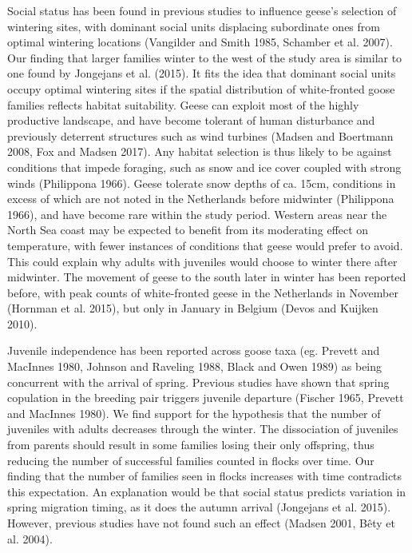 \documentclass[10pt,twocolumn]{paper}
\begin{document}
Social status has been found in previous studies to influence geese's
selection of wintering sites, with dominant social units displacing
subordinate ones from optimal wintering locations (Vangilder and Smith
1985, Schamber et al. 2007). Our finding that larger families winter to
the west of the study area is similar to one found by Jongejans et al.
(2015). It fits the idea that dominant social units occupy optimal
wintering sites if the spatial distribution of white-fronted goose
families reflects habitat suitability. Geese can exploit most of the
highly productive landscape, and have become tolerant of human
disturbance and previously deterrent structures such as wind turbines
(Madsen and Boertmann 2008, Fox and Madsen 2017). Any habitat selection
is thus likely to be against conditions that impede foraging, such as
snow and ice cover coupled with strong winds (Philippona 1966). Geese
tolerate snow depths of ca. 15cm, conditions in excess of which are not
noted in the Netherlands before midwinter (Philippona 1966), and have
become rare within the study period. Western areas near the North Sea
coast may be expected to benefit from its moderating effect on
temperature, with fewer instances of conditions that geese would prefer
to avoid. This could explain why adults with juveniles would choose to
winter there after midwinter. The movement of geese to the south later
in winter has been reported before, with peak counts of white-fronted
geese in the Netherlands in November (Hornman et al. 2015), but only in
January in Belgium (Devos and Kuijken 2010).

Juvenile independence has been reported across goose taxa (eg. Prevett
and MacInnes 1980, Johnson and Raveling 1988, Black and Owen 1989) as
being concurrent with the arrival of spring. Previous studies have shown
that spring copulation in the breeding pair triggers juvenile departure
(Fischer 1965, Prevett and MacInnes 1980). We find support for the
hypothesis that the number of juveniles with adults decreases through
the winter. The dissociation of juveniles from parents should result in
some families losing their only offspring, thus reducing the number of
successful families counted in flocks over time. Our finding that the
number of families seen in flocks increases with time contradicts this
expectation. An explanation would be that social status predicts
variation in spring migration timing, as it does the autumn arrival
(Jongejans et al. 2015). However, previous studies have not found such
an effect (Madsen 2001, Bêty et al. 2004).
\end{document}
